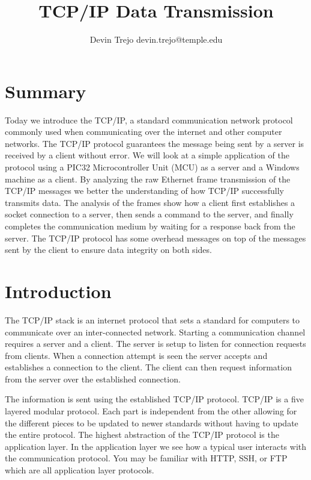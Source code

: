 \documentclass[12pt]{article}
\begin{document}
\title{TCP/IP Data Transmission}
\author{Devin Trejo \tabularnewline devin.trejo@temple.edu }
\date{}
\maketitle

\section{Summary}
Today we introduce the TCP/IP, a standard communication network protocol 
commonly used when communicating over the internet and other computer 
networks. The TCP/IP protocol guarantees the message being sent by a server 
is received by a client without error. We will look at a simple application
of the protocol using a PIC32 Microcontroller Unit (MCU) as a server and 
a Windows machine as a client. By analyzing the raw Ethernet frame 
transmission of the TCP/IP messages we better the understanding of how 
TCP/IP successfully transmits data. The analysis of the frames show how 
a client first establishes a socket connection to a server, then sends a 
command to the server, and finally completes the communication medium by 
waiting for a response back from the server. The TCP/IP protocol has some 
overhead messages on top of the messages sent by the client to ensure data 
integrity on both sides.  

\section{Introduction}
The TCP/IP stack is an internet protocol that sets a standard for computers
to communicate over an inter-connected network. Starting a communication 
channel requires a server and a client. The server is setup to listen for 
connection requests from clients. When a connection attempt is seen the 
server accepts and establishes a connection to the client. The client can 
then request information from the server over the established connection.

The information is sent using the established TCP/IP protocol. TCP/IP is a 
five layered modular protocol. Each part is independent from the other 
allowing for the different pieces to be updated to newer standards without 
having to update the entire protocol. The highest abstraction of the TCP/IP 
protocol is the application layer. In the application layer we see how a 
typical user interacts with the communication protocol. You may be familiar 
with HTTP, SSH, or FTP which are all application layer protocols. 
\end{document}
